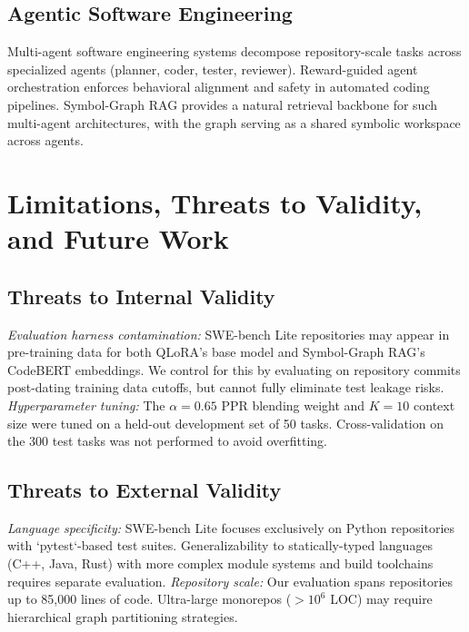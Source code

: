 \documentclass[10pt,twocolumn,letterpaper]{article}
\begin{document}
\subsection{Agentic Software Engineering}


Multi-agent software engineering systems \cite{arxiv_2404_01131,arxiv_2412_06333} decompose repository-scale tasks across specialized agents (planner, coder, tester, reviewer). Reward-guided agent orchestration enforces behavioral alignment and safety in automated coding pipelines. Symbol-Graph RAG provides a natural retrieval backbone for such multi-agent architectures, with the graph serving as a shared symbolic workspace across agents.




\section{Limitations, Threats to Validity, and Future Work}



\subsection{Threats to Internal Validity}


\textit{Evaluation harness contamination:} SWE-bench Lite repositories may appear in pre-training data for both QLoRA's base model and Symbol-Graph RAG's CodeBERT embeddings. We control for this by evaluating on repository commits post-dating training data cutoffs, but cannot fully eliminate test leakage risks. \textit{Hyperparameter tuning:} The $\alpha = 0.65$ PPR blending weight and $K = 10$ context size were tuned on a held-out development set of 50 tasks. Cross-validation on the 300 test tasks was not performed to avoid overfitting.


\subsection{Threats to External Validity}


\textit{Language specificity:} SWE-bench Lite focuses exclusively on Python repositories with `pytest`-based test suites. Generalizability to statically-typed languages (C++, Java, Rust) with more complex module systems and build toolchains requires separate evaluation. \textit{Repository scale:} Our evaluation spans repositories up to 85,000 lines of code. Ultra-large monorepos ($>10^6$ LOC) may require hierarchical graph partitioning strategies.
\end{document}
